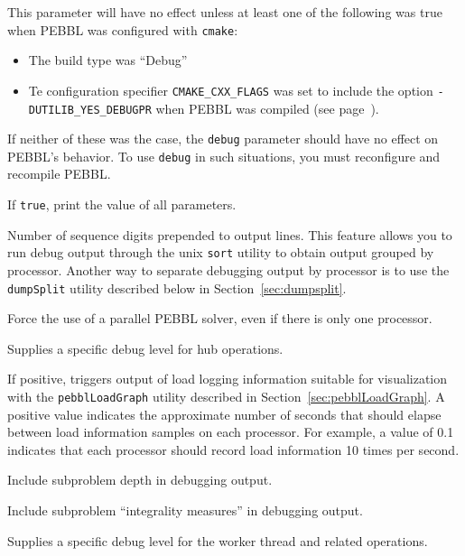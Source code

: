 This parameter will have no effect unless at least one of the following was true when 
PEBBL was configured with \texttt{cmake}:
\begin{itemize}
\item  The build type was ``Debug''
\item  Te configuration specifier \texttt{CMAKE\_CXX\_\linebreak[1]FLAGS} was
set to include the option \texttt{-DUTILIB\_YES\_\linebreak[1]DEBUGPR} when PEBBL was
compiled (see page~\pageref{advancedoptions}).
\end{itemize}
If neither of these was the case, the \texttt{debug} parameter should have no
effect on PEBBL's behavior.  To use \texttt{debug} in such situations, you
must reconfigure and recompile PEBBL.

If \texttt{true}, print the value of all parameters.

Number of sequence digits prepended to output lines.  This feature
allows you to run debug output through the unix \texttt{sort} utility
to obtain output grouped by processor.  Another way to separate
debugging output by processor is to use the \texttt{dumpSplit} 
utility described below in Section~\ref{sec:dumpsplit}.

 Force the use of a parallel PEBBL
solver, even if there is only one processor.  

Supplies a specific debug level for hub operations.

 If positive, triggers output of
load logging information suitable for visualization with the 
\texttt{pebblLoadGraph} utility described in
Section~\ref{sec:pebblLoadGraph}.  A positive value indicates the
approximate number of seconds that should elapse between load information
samples on each processor.  For example, a value of 0.1 indicates that
each processor should record load information 10 times per second.

Include subproblem depth in debugging output.

Include subproblem ``integrality measures'' in debugging output.

Supplies a specific debug level for the worker thread and related operations.



